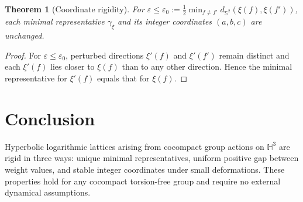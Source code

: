﻿\documentclass[12pt]{article}
\newtheorem{theorem}{Theorem}[section]
\theoremstyle{definition}
\theoremstyle{remark}
\newcommand{\Hthree}{\mathbb{H}^3}
\begin{document}
\begin{theorem}[Coordinate rigidity]\label{thm:rigidity}
For $\varepsilon\leq\varepsilon_0:=\tfrac12\min_{f\neq f'}
d_{\mathbb{S}^2}(\xi(f),\xi(f'))$, each minimal representative
$\gamma_\xi$ and its integer coordinates $(a,b,c)$ are unchanged.
\end{theorem}

\begin{proof}
For $\varepsilon\leq\varepsilon_0$, perturbed directions $\xi'(f)$ and
$\xi'(f')$ remain distinct and each $\xi'(f)$ lies closer to $\xi(f)$
than to any other direction. Hence the minimal representative for $\xi'(f)$
equals that for $\xi(f)$.
\end{proof}

\section{Conclusion}

Hyperbolic logarithmic lattices arising from cocompact group actions on
$\Hthree$ are rigid in three ways: unique minimal representatives, uniform
positive gap between weight values, and stable integer coordinates under
small deformations. These properties hold for any cocompact torsion-free
group and require no external dynamical assumptions.



\end{document}
